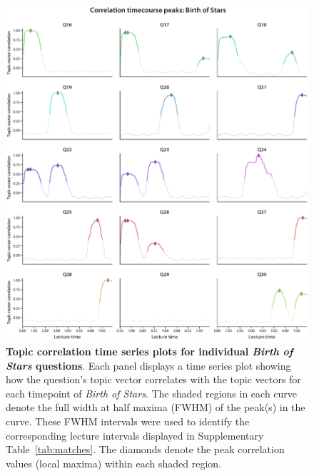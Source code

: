 \documentclass[10pt]{article}
\begin{document}
\begin{figure}[tp]
    \centering
    \includegraphics[width=\textwidth]{figs/bos-qcorrs-peaks}

    \caption{\textbf{Topic correlation time series plots for individual
    \textit{Birth of Stars} questions}. Each panel displays a
    time series plot showing how the question's topic vector correlates with the
    topic vectors for each timepoint of \textit{Birth of Stars}. The
    shaded regions in each curve denote the full width at half maxima (FWHM)
    of the peak(s) in the curve. These FWHM intervals were used to identify the
    corresponding lecture intervals displayed in Supplementary
    Table~\ref{tab:matches}. The diamonds denote the peak correlation values
    (local maxima) within each shaded region.}

    \label{fig:bos-peaks}
\end{figure}
\end{document}
